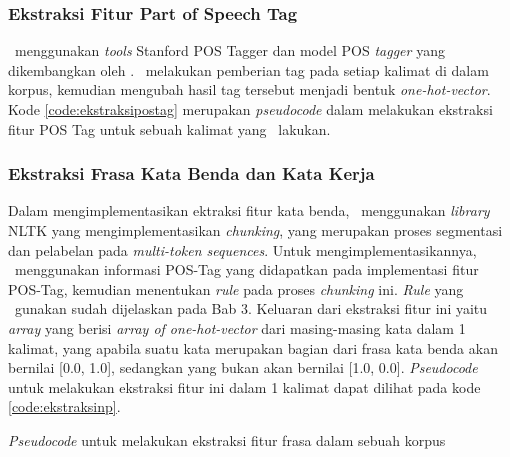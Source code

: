 \subsubsection{Ekstraksi Fitur Part of Speech Tag}
\Saya~menggunakan \textit{tools} Stanford POS Tagger \citep{toutanova2000enriching} dan model POS \textit{tagger} yang dikembangkan oleh \cite{dinakaramani2014designing}. \Saya~melakukan pemberian tag pada setiap kalimat di dalam korpus, kemudian mengubah hasil tag tersebut menjadi bentuk \textit{one-hot-vector}. Kode \ref{code:ekstraksipostag} merupakan \textit{pseudocode} dalam melakukan ekstraksi fitur POS Tag untuk sebuah kalimat yang \saya~lakukan.

\subsubsection{Ekstraksi Frasa Kata Benda dan Kata Kerja}
Dalam mengimplementasikan ektraksi fitur kata benda, \saya~menggunakan \textit{library} NLTK \citep{bird2009nltk} yang mengimplementasikan \textit{chunking}, yang merupakan proses segmentasi dan pelabelan pada \textit{multi-token sequences}. Untuk mengimplementasikannya, \saya~menggunakan informasi POS-Tag yang didapatkan pada implementasi fitur POS-Tag, kemudian menentukan \textit{rule} pada proses \textit{chunking} ini. \textit{Rule} yang \saya~gunakan sudah dijelaskan pada Bab 3. Keluaran dari ekstraksi fitur ini yaitu \textit{array} yang berisi \textit{array of one-hot-vector} dari masing-masing kata dalam 1 kalimat, yang apabila suatu kata merupakan bagian dari frasa kata benda akan bernilai [0.0, 1.0], sedangkan yang bukan akan bernilai [1.0, 0.0]. \textit{Pseudocode} untuk melakukan ekstraksi fitur ini dalam 1 kalimat dapat dilihat pada kode \ref{code:ekstraksinp}.

\begin{kode}

	
	\SetAlgoLined
	\BlankLine	
	\caption{\textit{Pseudocode} untuk melakukan ekstraksi fitur frasa dalam sebuah korpus}
	\label{code:ekstraksinp}	
\end{kode}

